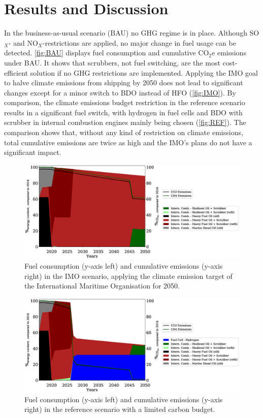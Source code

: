 \documentclass[article]{elsarticle}
\begin{document}
\section{Results and Discussion}
\label{sec:Results}
In the business-as-usual scenario (BAU) no GHG regime is in place. Although SO$_X$- and NO$_X$-restrictions are applied, no major change in fuel usage can be detected. \autoref{fig:BAU} displays fuel consumption and cumulative CO$_2$e emissions under BAU. It shows that scrubbers, not fuel switching, are the most cost-efficient solution if no GHG restrictions are implemented. Applying the IMO goal to halve climate emissions from shipping by 2050 does not lead to significant changes except for a minor switch to BDO instead of HFO (\autoref{fig:IMO}). By comparison, the climate emissions budget restriction in the reference scenario  results in a significant fuel switch, with hydrogen in fuel cells and BDO with scrubber in internal combustion engines mainly being chosen (\autoref{fig:REF}). The comparison shows that, without any kind of restriction on climate emissions, total cumulative emissions are twice as high and the IMO's plans do not have a significant impact. 

\begin{figure}
    \centering
    \includegraphics[width=\textwidth]{figures/IMO_fuels_emissions.eps}
    \caption{Fuel consumption (y-axis left) and cumulative emissions (y-axis right) in the IMO scenario, applying the climate emission target of the International Maritime Organisation for 2050.}
    \label{fig:IMO}
\end{figure}

\begin{figure}
    \centering
    \includegraphics[width=\textwidth]{figures/RS_fuels_emissions.eps}
    \caption{Fuel consumption (y-axis left) and cumulative emissions (y-axis right) in the reference scenario with a limited carbon budget.}
    \label{fig:REF}
\end{figure}
\end{document}
